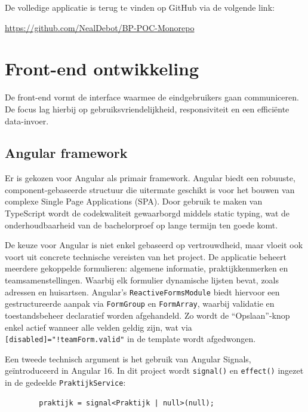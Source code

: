 De volledige applicatie is terug te vinden op GitHub via de volgende link:

\href{https://github.com/NealDebot/BP-POC-Monorepo}{https://github.com/NealDebot/BP-POC-Monorepo}

\section{Front-end ontwikkeling}
\label{sec:frontend}

De front-end vormt de interface waarmee de eindgebruikers gaan communiceren. 
De focus lag hierbij op gebruiksvriendelijkheid, responsiviteit en een efficiënte data-invoer.

\subsection{Angular framework}
\label{subsec:Angular}

Er is gekozen voor Angular als primair framework. 
Angular biedt een robuuste, component-gebaseerde structuur die uitermate geschikt is voor het bouwen van complexe Single Page Applications (SPA). 
Door gebruik te maken van TypeScript wordt de codekwaliteit gewaarborgd middels static typing, wat de onderhoudbaarheid van de bachelorproef op lange termijn ten goede komt.
\medskip

De keuze voor Angular is niet enkel gebaseerd op vertrouwdheid, maar vloeit ook voort uit concrete technische vereisten van het project. 
De applicatie beheert meerdere gekoppelde formulieren: algemene informatie, praktijkkenmerken en teamsamenstellingen. Waarbij elk formulier dynamische lijsten bevat, zoals adressen en huisartsen.
Angular's \texttt{ReactiveFormsModule} biedt hiervoor een gestructureerde aanpak via \texttt{FormGroup} en \texttt{FormArray}, waarbij validatie en toestandsbeheer declaratief worden afgehandeld.
Zo wordt de ``Opslaan''-knop enkel actief wanneer alle velden geldig zijn, wat via \texttt{[disabled]="!teamForm.valid"} in de template wordt afgedwongen.
\medskip

Een tweede technisch argument is het gebruik van Angular Signals, geïntroduceerd in Angular 16.
In dit project wordt \texttt{signal()} en \texttt{effect()} ingezet in de gedeelde \texttt{PraktijkService}:
 
\begin{listing}[H]
    \begin{verbatim}
        praktijk = signal<Praktijk | null>(null);
    \end{verbatim}
\end{listing}
 
